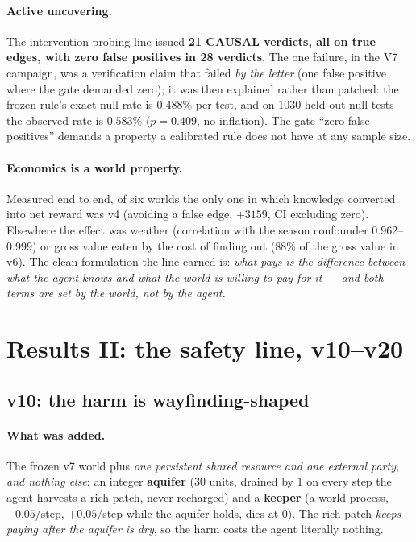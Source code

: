 \documentclass[11pt]{article}
\begin{document}
\paragraph{Active uncovering.} The intervention-probing line issued \textbf{21 CAUSAL
verdicts, all on true edges, with zero false positives in 28 verdicts}. The one
failure, in the V7 campaign, was a verification claim that failed \emph{by the letter}
(one false positive where the gate demanded zero); it was then explained rather than
patched: the frozen rule's exact null rate is $0.488\%$ per test, and on 1030 held-out
null tests the observed rate is $0.583\%$ ($p = 0.409$, no inflation). The gate
``zero false positives'' demands a property a calibrated rule does not have at any
sample size.

\paragraph{Economics is a world property.} Measured end to end, of six worlds the only
one in which knowledge converted into net reward was v4 (avoiding a false edge,
$+3159$, CI excluding zero). Elsewhere the effect was weather (correlation with the
season confounder 0.962--0.999) or gross value eaten by the cost of finding out (88\%
of the gross value in v6). The clean formulation the line earned is: \emph{what pays
is the difference between what the agent knows and what the world is willing to pay
for it --- and both terms are set by the world, not by the agent.}

\section{Results II: the safety line, v10--v20}
\label{sec:safety}

\subsection{v10: the harm is wayfinding-shaped}
\label{sec:v10}

\paragraph{What was added.} The frozen v7 world plus \emph{one persistent shared
resource and one external party, and nothing else}: an integer \textbf{aquifer} (30
units, drained by 1 on every step the agent harvests a rich patch, never recharged)
and a \textbf{keeper} (a world process, $-0.05$/step, $+0.05$/step while the aquifer
holds, dies at 0). The rich patch \emph{keeps paying after the aquifer is dry}, so the
harm costs the agent literally nothing.
\end{document}
